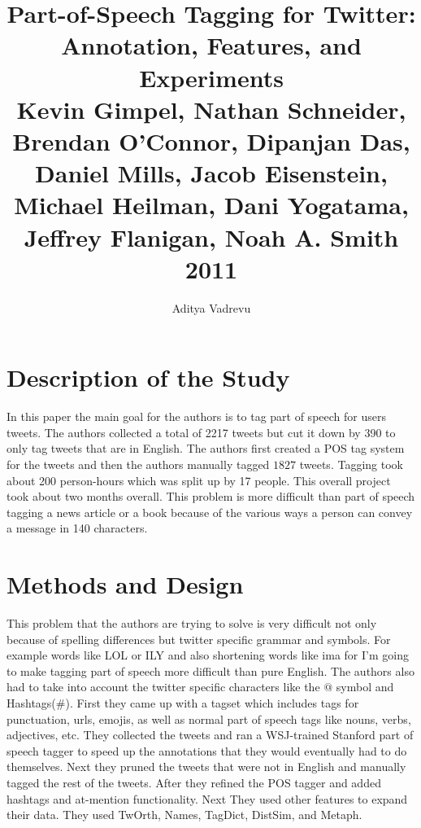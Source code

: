 \documentclass[journal, a4paper]{IEEEtran}
\begin{document}
	\title{Part-of-Speech Tagging for Twitter: Annotation, Features, and Experiments\\Kevin Gimpel, Nathan Schneider, Brendan O'Connor, Dipanjan Das, Daniel Mills, Jacob Eisenstein, Michael Heilman, Dani Yogatama, Jeffrey Flanigan, Noah A. Smith 2011}
	\author{Aditya Vadrevu}{}
	\maketitle
\section{Description of the Study} 
In this paper the main goal for the authors is to tag part of speech for users tweets. The authors collected a total of 2217 tweets but cut it down by 390 to only tag tweets that are in English. The authors first created a POS tag system for the tweets and then the authors manually tagged $1827$ tweets. Tagging took about 200 person-hours which was split up by 17 people. This overall project took about two months overall. This problem is more difficult than part of speech tagging a news article or a book because of the various ways a person can convey a message in 140 characters. 

\section{Methods and Design}
This problem that the authors are trying to solve is very difficult not only because of spelling differences but twitter specific grammar and symbols. For example words like LOL or ILY and also shortening words like ima for I'm going to make tagging part of speech more difficult than pure English. The authors also had to take into account the twitter specific characters like the $@$ symbol and Hashtags(\#). First they came up with a tagset which includes tags for punctuation, urls, emojis, as well as normal part of speech tags like nouns, verbs, adjectives, etc. They collected the tweets and ran a WSJ-trained Stanford part of speech tagger to speed up the annotations that they would eventually had to do themselves. Next they pruned the tweets that were not in English and manually tagged the rest of the tweets. After they refined the POS tagger and added hashtags and at-mention functionality. Next They used other features to expand their data. They used TwOrth, Names, TagDict, DistSim, and Metaph.
\end{document}
